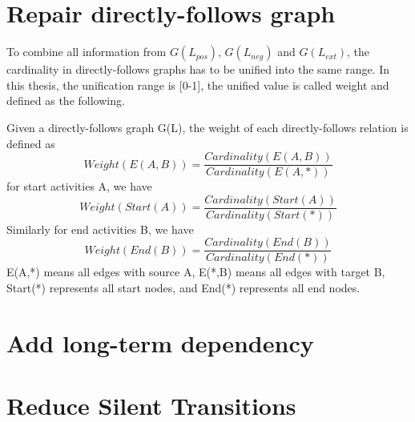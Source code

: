 \section{Repair directly-follows graph}
To combine all information from  $G(L_{pos})$, $G(L_{neg})$ and $G(L_{ext})$, the cardinality in directly-follows graphs has to be unified into the same range. In this thesis, the unification range is [0-1], the unified value is called weight and defined as the following.
\begin{definition}
	Given a directly-follows graph G(L), the weight of each directly-follows relation is defined as \[ Weight(E(A,B)) = \frac{Cardinality(E(A,B))}{Cardinality(E(A,*))}  \] 
	for start activities A, we have 
	\[ Weight(Start(A)) = \frac{Cardinality(Start(A))}{Cardinality(Start(*))} \]
	Similarly for end activities B, we have
	\[ Weight(End(B)) = \frac{Cardinality(End(B))}{Cardinality(End(*))} \]
	E(A,*) means all edges with source A, E(*,B) means all edges with target B, Start(*) represents all start nodes, and End(*) represents all end nodes.
\end{definition}

\section{Add long-term dependency}

\section{Reduce Silent Transitions}

